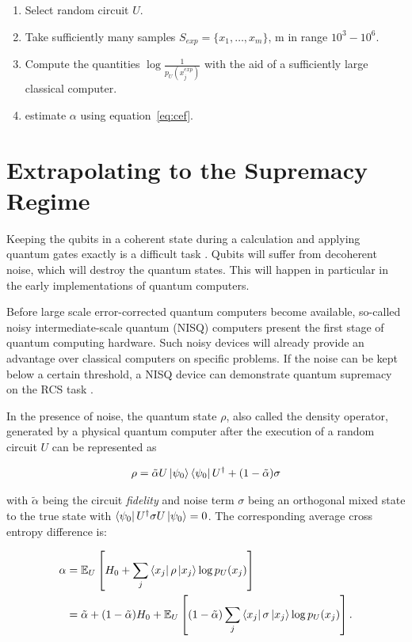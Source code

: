 \begin{enumerate}
\item Select random circuit $U$.
  \item Take sufficiently many samples $S_{exp} = \{x_1, \dots, x_m\}$, m in
    range $10^3-10^6$.
    \item Compute the quantities $\log{\frac{1}{p_U(x_j^{exp})}}$ with the aid
      of a sufficiently large classical computer.
      \item estimate $\alpha$ using equation~\ref{eq:cef}.
\end{enumerate}

\section{Extrapolating to the Supremacy Regime}
\label{sec:supremacy_regime}

Keeping the qubits in a coherent state during a calculation and applying quantum
gates exactly is a difficult task \cite{martines2019supremacy}. Qubits will suffer from decoherent noise, which will destroy the quantum states. This will happen in particular in the early implementations of quantum computers.

Before large scale error-corrected quantum computers become available, so-called noisy intermediate-scale quantum (NISQ) computers present the first stage
of quantum computing hardware. Such noisy devices will already provide an
advantage over classical computers on specific problems. If the noise can be
kept below a certain threshold, a NISQ device can demonstrate quantum
supremacy on the RCS task \cite{neill2018blueprint}.

In the presence of noise, the quantum state $\rho$, also called the density operator, generated by a physical quantum computer
after the execution of a random circuit $U$ can be represented as

\begin{equation}
  \rho = \tilde{\alpha} U \Ket{\psi_0} \Bra{\psi_0} U^{\dagger} + (1- \tilde{\alpha}) \sigma
\end{equation}

with $\tilde{\alpha}$ being the circuit \textit{fidelity} and noise term $\sigma$ being an orthogonal mixed state to the true state with
$\Bra{\psi_0}U^{\dagger}\sigma U \Ket{\psi_0} = 0$.
The corresponding average cross entropy difference is:

\begin{align}
  \alpha &= \mathbb{E}_U\left[H_0+ \sum_j \Bra{x_j} \rho \Ket{x_j} \log{p_U(x_j)} \right] \\
         &= \tilde{\alpha} + (1-\tilde{\alpha})H_0 + \mathbb{E}_U\left[(1-\tilde{\alpha}) \sum_j \Bra{x_j} \sigma \Ket{x_j} \log{p_U(x_j)}\right].
\end{align}

